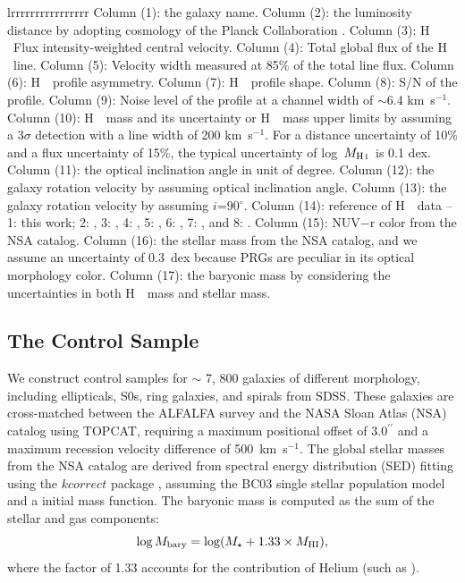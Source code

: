 \documentclass[twocolumn]{aastex631}
\newcommand{\MHI}{$M_{\rm H\, \textsc{i}}$}
\def\HI{H\,  {\textsc{\romannumeral 1}}}
\begin{document}
\begin{deluxetable*}{lrrrrrrrrrrrrrrrr}
{Column (1): the galaxy name. Column (2): the luminosity distance by adopting cosmology of the Planck Collaboration \citep{PlanckCollaboration2020AA...641A...6P}. Column (3): \HI\ Flux intensity-weighted central velocity. Column (4): Total global flux of the \HI\ line. Column (5): Velocity width measured at 85\% of the total line flux. Column (6): \HI\ profile asymmetry. Column (7): \HI\ profile shape. Column (8): S/N of the profile. Column (9): Noise level of the profile at a channel width of $\sim$6.4 km\,  s$^{-1}$. Column (10): \HI\ mass and its uncertainty or \HI\ mass upper limits by assuming a 3$\sigma$ detection with a line width of 200 km\,  s$^{-1}$. For a distance uncertainty of 10\% and a flux uncertainty of 15\%, the typical uncertainty of log~\MHI\ is 0.1 dex. Column (11): the optical inclination angle in unit of degree. Column (12): the galaxy rotation velocity by assuming optical inclination angle. Column (13): the galaxy rotation velocity by assuming $i$=90$^{\circ}$. Column (14): reference of \HI\ data -- 1: this work; 2: \citep{Masters2014MNRAS.443.1044M}, 3: \citep{Haynes2018ApJ...861...49H}, 4: \citep{Koribalski2004AJ....128...16K}, 5: \citep{Stark2021MNRAS.503.1345S}, 6: \citep{Richter1994AJ....107...99R}, 7: \citep{vanDriel2002AA...386..140V}, and 8: \citep{Springob2005ApJS..160..149S}. Column (15): NUV$-$r color from the NSA catalog. Column (16): the stellar mass from the NSA catalog, and we assume an uncertainty of 0.3~dex because PRGs are peculiar in its optical morphology color. Column (17): the baryonic mass by considering the uncertainties in both \HI\ mass and stellar mass.
}
\end{deluxetable*}

\subsection{The Control Sample}
\label{subsec:control}
We construct control samples for $\sim$ 7,  800 galaxies of different morphology, including ellipticals, S0s, ring galaxies, and spirals from SDSS. These galaxies are cross-matched between the ALFALFA survey \citep{Haynes2011AJ....142..170H, Haynes2018ApJ...861...49H} and the NASA Sloan Atlas (NSA) catalog \citep{Blanton2011AJ....142...31B} using TOPCAT, requiring a maximum positional offset of $3.0^{\prime\prime}$ and a maximum recession velocity difference of 500~km~s$^{-1}$. The global stellar masses from the NSA catalog are derived from spectral energy distribution (SED) fitting using the $kcorrect$ package \citep{Blanton2007AJ....133..734B}, assuming the BC03 single stellar population model \citep{Bruzual2003MNRAS.344.1000B} and a \citet{Chabrier2003PASP..115..763C} initial mass function. The baryonic mass is computed as the sum of the stellar and gas components:
\begin{equation}
\log M_{\rm bary} = \log (M_\star + 1.33 \times M_{\rm HI}),  
\end{equation}
where the factor of 1.33 accounts for the contribution of Helium (such as \citealt{Salucci1999MNRAS.309..923S, Bell2003ApJ...585L.117B}).
\end{document}
